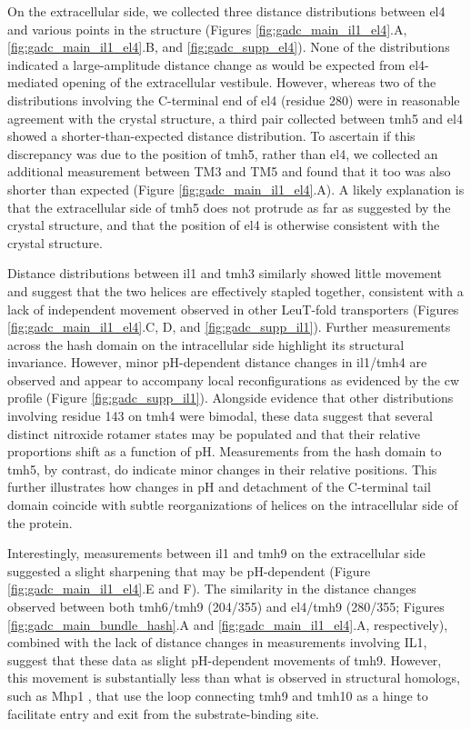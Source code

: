 On the extracellular side, we collected three distance distributions between \gls{el}4 and various points in the structure (Figures \ref{fig:gadc_main_il1_el4}.A, \ref{fig:gadc_main_il1_el4}.B, and \ref{fig:gadc_supp_el4}). None of the distributions indicated a large-amplitude distance change as would be expected from \gls{el}4-mediated opening of the extracellular vestibule. However, whereas two of the distributions involving the C-terminal end of \gls{el}4 (residue 280) were in reasonable agreement with the crystal structure, a third pair collected between \gls{tmh}5 and \gls{el}4 showed a shorter-than-expected distance distribution. To ascertain if this discrepancy was due to the position of \gls{tmh}5, rather than \gls{el}4, we collected an additional measurement between TM3 and TM5 and found that it too was also shorter than expected (Figure \ref{fig:gadc_main_il1_el4}.A). A likely explanation is that the extracellular side of \gls{tmh}5 does not protrude as far as suggested by the crystal structure, and that the position of \gls{el}4 is otherwise consistent with the crystal structure.

Distance distributions between \gls{il}1 and \gls{tmh}3 similarly showed little movement and suggest that the two helices are effectively stapled together, consistent with a lack of independent movement observed in other LeuT-fold transporters (Figures \ref{fig:gadc_main_il1_el4}.C, D, and \ref{fig:gadc_supp_il1}). Further measurements across the hash domain on the intracellular side highlight its structural invariance. However, minor pH-dependent distance changes in \gls{il}1/\gls{tmh}4 are observed and appear to accompany local reconfigurations as evidenced by the \gls{cw} profile (Figure \ref{fig:gadc_supp_il1}). Alongside evidence that other distributions involving residue 143 on \gls{tmh}4 were bimodal, these data suggest that several distinct nitroxide rotamer states may be populated and that their relative proportions shift as a function of pH. Measurements from the hash domain to \gls{tmh}5, by contrast, do indicate minor changes in their relative positions. This further illustrates how changes in pH and detachment of the C-terminal tail domain coincide with subtle reorganizations of helices on the intracellular side of the protein.

Interestingly, measurements between \gls{il}1 and \gls{tmh}9 on the extracellular side suggested a slight sharpening that may be pH-dependent (Figure \ref{fig:gadc_main_il1_el4}.E and F). The similarity in the distance changes observed between both \gls{tmh}6/\gls{tmh}9 (204/355) and \gls{el}4/\gls{tmh}9 (280/355; Figures \ref{fig:gadc_main_bundle_hash}.A and \ref{fig:gadc_main_il1_el4}.A, respectively), combined with the lack of distance changes in measurements involving IL1, suggest that these data as slight pH-dependent movements of \gls{tmh}9. However, this movement is substantially less than what is observed in structural homologs, such as Mhp1 \citep*{Shimamura2010, Weyand2011, Weyand2008}, that use the loop connecting \gls{tmh}9 and \gls{tmh}10 as a hinge to facilitate entry and exit from the substrate-binding site.

